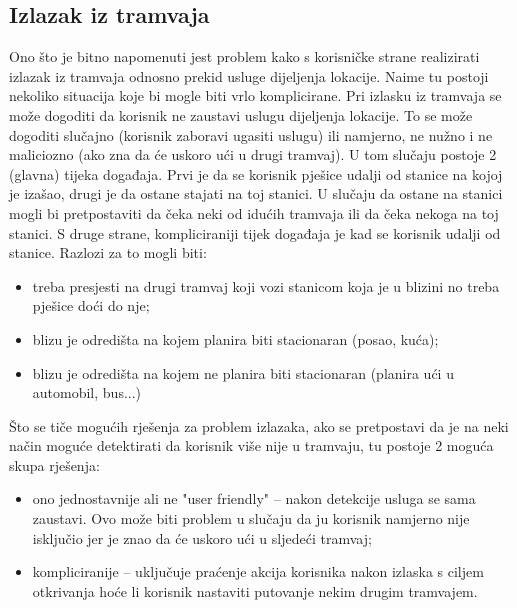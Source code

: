 \documentclass[times, utf8, diplomski]{fer}
\begin{document}
\subsection{Izlazak iz tramvaja}

Ono što je bitno napomenuti jest problem kako s korisničke strane realizirati izlazak iz tramvaja odnosno prekid usluge dijeljenja lokacije. Naime tu postoji nekoliko situacija koje bi mogle biti vrlo komplicirane. Pri izlasku iz tramvaja se može dogoditi da korisnik ne zaustavi uslugu dijeljenja lokacije. To se može dogoditi slučajno (korisnik zaboravi ugasiti uslugu) ili namjerno, ne nužno i ne maliciozno (ako zna da će uskoro ući u drugi tramvaj). U tom slučaju postoje 2 (glavna) tijeka događaja. Prvi je da se korisnik pješice udalji od stanice na kojoj je izašao, drugi je da ostane stajati na toj stanici. U slučaju da ostane na stanici mogli bi pretpostaviti da čeka neki od idućih tramvaja ili da čeka nekoga na toj stanici. S druge strane, kompliciraniji tijek događaja je kad se korisnik udalji od stanice. Razlozi za to mogli biti:
\begin{itemize}
    \item treba presjesti na drugi tramvaj koji vozi stanicom koja je u blizini no treba pješice doći do nje;
    \item blizu je odredišta na kojem planira biti stacionaran (posao, kuća);
    \item blizu je odredišta na kojem ne planira biti stacionaran (planira ući u automobil, bus...)
\end{itemize}

Što se tiče mogućih rješenja za problem izlazaka, ako se pretpostavi da je na neki način moguće detektirati da korisnik više nije u tramvaju, tu postoje 2 moguća skupa rješenja:
\begin{itemize}
    \item ono jednostavnije ali ne "user friendly" -- nakon detekcije usluga se sama zaustavi. Ovo može biti problem u slučaju da ju korisnik namjerno nije isključio jer je znao da će uskoro ući u sljedeći tramvaj;
    \item kompliciranije -- uključuje praćenje akcija korisnika nakon izlaska s ciljem otkrivanja hoće li korisnik nastaviti putovanje nekim drugim tramvajem.

\end{itemize}
\end{document}
